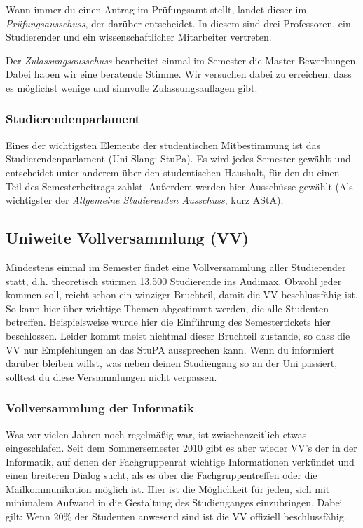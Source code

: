 		Wann immer du einen Antrag im Prüfungsamt stellt, landet
		dieser im \emph{Prüfungsausschuss}, der darüber
		entscheidet. In diesem sind drei Professoren, ein Studierender und ein wissenschaftlicher Mitarbeiter vertreten.

		Der \emph{Zulassungsausschuss} bearbeitet einmal im
		Semester die Master-Bewerbungen. Dabei haben wir eine
		beratende Stimme. Wir versuchen dabei zu erreichen,
		dass es möglichst wenige  und sinnvolle Zulassungsauflagen gibt.

	\subsubsection*{Studierendenparlament}
		Eines der wichtigsten Elemente der studentischen
		Mitbestimmung ist das Studierendenparlament (Uni-Slang:
		StuPa). Es wird jedes Semester gewählt und entscheidet
		unter anderem über den studentischen Haushalt, für den
		du einen Teil des Semesterbeitrags zahlst. Außerdem werden hier Ausschüsse gewählt (Als wichtigster der \emph{Allgemeine Studierenden Ausschuss}, kurz AStA).
	\subsection*{Uniweite Vollversammlung (VV)}
		Mindestens einmal im Semester findet eine
		Vollversammlung aller Studierender statt, d.h. theoretisch
		stürmen 13.500 Studierende ins Audimax. Obwohl jeder kommen
		soll, reicht schon ein winziger Bruchteil, damit
		die VV beschlussfähig ist. So kann hier über wichtige
		Themen abgestimmt werden, die alle Studenten betreffen.
		Beispielsweise wurde hier die Einführung des Semestertickets
		hier beschlossen. Leider kommt meist nichtmal dieser
		Bruchteil zustande, so dass die VV  nur Empfehlungen
		an das StuPA aussprechen kann. Wenn du informiert darüber 
		bleiben willst, was neben deinen Studiengang so an der
		Uni passiert, solltest du diese Versammlungen nicht verpassen.

		\subsubsection*{Vollversammlung der Informatik}
			Was vor vielen Jahren noch regelmäßig war, ist
			zwischenzeitlich etwas eingeschlafen. Seit dem
			Sommersemester 2010 gibt es aber wieder VV's der
			in der Informatik, auf denen der
			Fachgruppenrat
			wichtige Informationen verkündet und einen
			breiteren Dialog sucht, als es über die
			Fachgruppentreffen oder die Mailkommunikation
			möglich ist. Hier ist die Möglichkeit für jeden,
			sich mit minimalem Aufwand in die Gestaltung des
			Studienganges einzubringen. Dabei gilt: Wenn
			20\% der Studenten anwesend sind  ist die VV offiziell beschlussfähig.
